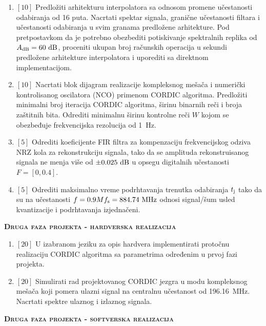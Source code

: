 \documentclass[a4paper]{article}
\begin{document}
\begin{enumerate}
\item $[10]$ Predložiti arhitekturu interpolatora sa odnosom promene učestanosti odabiranja od 16 puta. Nacrtati spektar signala, granične učestanosti filtara i učestanosti odabiranja u svim granama predložene arhitekture.
Pod pretpostavkom da je potrebno obezbediti potiskivanje spektralnih replika od $A_{\mathrm{dB}}=60~\mathrm{dB}$, proceniti ukupan broj računskih operacija u sekundi predložene arhitekture interpolatora i uporediti sa direktnom implementacijom.
\item $[10]$ Nacrtati blok dijagram realizacije kompleksnog mešača i numerički kontrolisanog oscilatora (NCO) primenom CORDIC algoritma. Predložiti minimalni broj iteracija CORDIC algoritma, širinu binarnih reči i broja zaštitnih bita. Odrediti minimalnu širinu kontrolne reči $W$ kojom se obezbeđuje frekvencijska rezolucija od 1~Hz.
\item $[5]$ Odrediti koeficijente FIR filtra za kompenzaciju frekvencijskog odziva NRZ kola za rekonstrukciju signala, tako da se amplituda rekonstruisanog signala ne menja više od $\pm 0.025~\mathrm{dB}$ u opsegu digitalnih učestanosti $F=[0,0.4]$.
\item $[5]$ Odrediti maksimalno vreme podrhtavanja trenutka odabiranja $t_{\mathrm{j}}$ tako da su na učestanosti $f=0.9 M f_{\mathrm{s}}=884.74~\mathrm{MHz}$ odnosi signal/šum usled kvantizacije i podrhtavanja izjednačeni.


\end{enumerate}

\begin{center}
\large{\textbf{\textsc{Druga faza projekta - hardverska realizacija}}}
\end{center}

\begin{enumerate}
\item $[20]$ U izabranom jeziku za opis hardvera implementirati protočnu realizaciju CORDIC algoritma sa parametrima određenim u prvoj fazi projekta.
\item $[20]$ Simulirati rad projektovanog CORDIC jezgra u modu kompleksnog mešača koji pomera ulazni signal na centralnu učestanost od 196.16~MHz. Nacrtati spektre ulaznog i izlaznog signala.
\end{enumerate}

\begin{center}
\large{\textbf{\textsc{Druga faza projekta - softverska realizacija}}}
\end{center}
\end{document}
